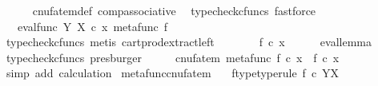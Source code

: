 \begin{isabellebody}
\ \ \ \ \isamarkupfalse%
\ cnufatem{\isacharunderscore}{\kern0pt}def{}\ comp{\isacharunderscore}{\kern0pt}associative{}\ \isamarkupfalse%
\ {\isacharparenleft}{\kern0pt}typecheck{\isacharunderscore}{\kern0pt}cfuncs{\isacharcomma}{\kern0pt}\ fastforce{\isacharparenright}{\kern0pt}\isanewline
\ \ \isamarkupfalse%
\ \isamarkupfalse%
\ {\isachardoublequoteopen}{\isachardot}{\kern0pt}{\isachardot}{\kern0pt}{\isachardot}{\kern0pt}\ {\isacharequal}{\kern0pt}\ eval{\isacharunderscore}{\kern0pt}func\ Y\ X\ {\isasymcirc}\isactrlsub c\ {\isasymlangle}x{\isacharcomma}{\kern0pt}\ {\isacharparenleft}{\kern0pt}metafunc\ f{\isacharparenright}{\kern0pt}{\isasymrangle}{\isachardoublequoteclose}\isanewline
\ \ \ \ \isamarkupfalse%
\ {\isacharparenleft}{\kern0pt}typecheck{\isacharunderscore}{\kern0pt}cfuncs{\isacharcomma}{\kern0pt}\ metis\ cart{\isacharunderscore}{\kern0pt}prod{\isacharunderscore}{\kern0pt}extract{\isacharunderscore}{\kern0pt}left{\isacharparenright}{\kern0pt}\isanewline
\ \ \isamarkupfalse%
\ \isamarkupfalse%
\ {\isachardoublequoteopen}{\isachardot}{\kern0pt}{\isachardot}{\kern0pt}{\isachardot}{\kern0pt}\ {\isacharequal}{\kern0pt}\ f\ {\isasymcirc}\isactrlsub c\ x{\isachardoublequoteclose}\isanewline
\ \ \ \ \isamarkupfalse%
\ eval{\isacharunderscore}{\kern0pt}lemma\ \isamarkupfalse%
\ {\isacharparenleft}{\kern0pt}typecheck{\isacharunderscore}{\kern0pt}cfuncs{\isacharcomma}{\kern0pt}\ presburger{\isacharparenright}{\kern0pt}\isanewline
\ \ \isamarkupfalse%
\ \isamarkupfalse%
\ {\isachardoublequoteopen}cnufatem\ {\isacharparenleft}{\kern0pt}metafunc\ f{\isacharparenright}{\kern0pt}\ {\isasymcirc}\isactrlsub c\ x\ {\isacharequal}{\kern0pt}\ f\ {\isasymcirc}\isactrlsub c\ x{\isachardoublequoteclose}\isanewline
\ \ \ \ \isamarkupfalse%
\ {\isacharparenleft}{\kern0pt}simp\ add{\isacharcolon}{\kern0pt}\ calculation{\isacharparenright}{\kern0pt}\isanewline
{}\isamarkupfalse%
%
\endisatagproof
{\isafoldproof}%
%
\isadelimproof
\isanewline
%
\endisadelimproof
\isanewline
{}\isamarkupfalse%
\ metafunc{\isacharunderscore}{\kern0pt}cnufatem{\isacharcolon}{\kern0pt}\isanewline
\ \ \ f{\isacharunderscore}{\kern0pt}type{\isacharbrackleft}{\kern0pt}type{\isacharunderscore}{\kern0pt}rule{\isacharbrackright}{\kern0pt}{\isacharcolon}{\kern0pt}\ {\isachardoublequoteopen}f\ {\isasymin}\isactrlsub c\ Y\isactrlbsup X\isactrlesup {\isachardoublequoteclose}\isanewline

\end{isabellebody}
